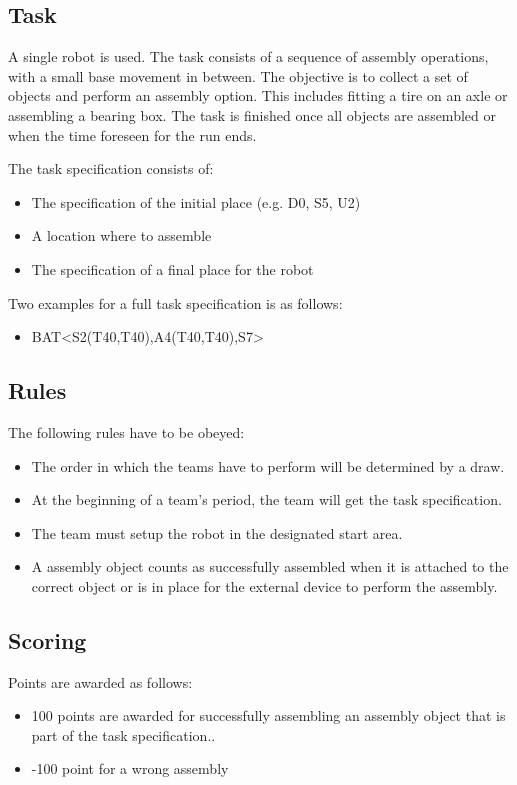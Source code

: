 \subsection{Task}
A single robot is used. The task consists of a sequence of assembly operations, with a small base movement in between. The objective is to collect a set of objects and perform an assembly option. This includes fitting a tire on an axle or assembling a bearing box. The task is finished once all objects are assembled or when the time foreseen for the run ends. 
\par
The task specification consists of: 
\begin{itemize}
	\item The specification of the initial place (e.g. D0, S5, U2)
	\item A location where to assemble
	\item The specification of a final place for the robot 
\end{itemize}

Two examples for a full task specification is as follows:
\begin{itemize}
	\item BAT\textless S2(T40,T40),A4(T40,T40),S7\textgreater  
\end{itemize}

\subsection{Rules}
The following rules have to be obeyed:

\begin{itemize}
\item The order in which the teams have to perform will be determined by a draw.
\item At the beginning of a team's period, the team will get the task specification. 
\item The team must setup the robot in the designated start area.
\item A assembly object counts as successfully assembled when it is attached to the correct object or is in place for the external device to perform the assembly.
\end{itemize}


\subsection{Scoring}
Points are awarded as follows:

\begin{itemize}
\item 100 points are awarded for successfully assembling an assembly object that is part of the task specification..
\item -100 point for a wrong assembly
\end{itemize}


